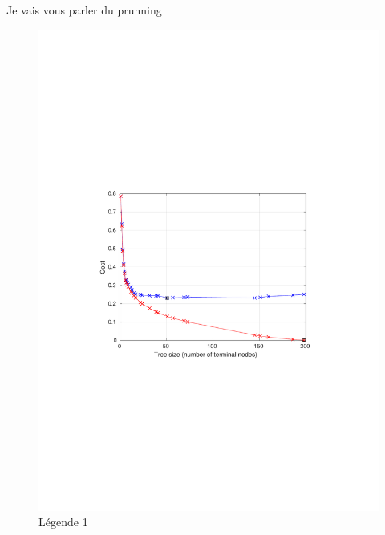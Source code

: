 Je vais vous parler du prunning


\begin{figure}[t!]
   \begin{minipage}[b]{0.60\linewidth}
       \includegraphics[scale=0.20]{graphs/clean_dataset/clean_pruning.pdf}
      \caption{Légende 1}
   \end{minipage}\hfill


\end{figure}
